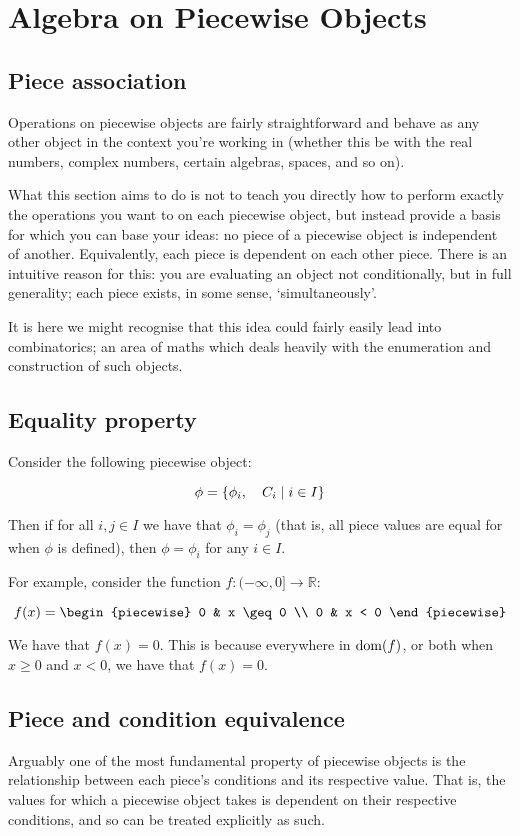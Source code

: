 \section{Algebra on Piecewise Objects}
\subsection{Piece association}
Operations on piecewise objects are fairly straightforward and behave as any other object in the context you're working in (whether this be with the real numbers, complex numbers, certain algebras, spaces, and so on). 

What this section aims to do is not to teach you directly how to perform exactly the operations you want to on each piecewise object, but instead provide a basis for which you can base your ideas: no piece of a piecewise object is independent of another. Equivalently, each piece is dependent on each other piece. There is an intuitive reason for this: you are evaluating an object not conditionally, but in full generality; each piece exists, in some sense, `simultaneously'.

It is here we might recognise that this idea could fairly easily lead into combinatorics; an area of maths which deals heavily with the enumeration and construction of such objects.
\subsection{Equality property}
\begin{theorem}
    Consider the following piecewise object:

    $$
        \phi=\{\phi_i,\quad C_i\mid i\in I\}
    $$

    Then if for all $i,j\in I$ we have that $\phi_i=\phi_j$ (that is, all piece values are equal for when $\phi$ is defined), then $\phi=\phi_i$ for any $i\in I$.

    For example, consider the function $f:(-\infty,0]\to\mathbb{R}$:

    $$
        f(x) = \begin{piecewise}
            0 & x \geq 0 \\
            0 & x < 0
        \end{piecewise}
    $$

    We have that $f(x)=0$. This is because everywhere in $\operatorname{dom}(f)$, or both when $x\geq 0$ and $x < 0$, we have that $f(x)=0$.
\end{theorem}

\subsection{Piece and condition equivalence}
Arguably one of the most fundamental property of piecewise objects is the relationship between each piece's conditions and its respective value. That is, the values for which a piecewise object takes is dependent on their respective conditions, and so can be treated explicitly as such.

